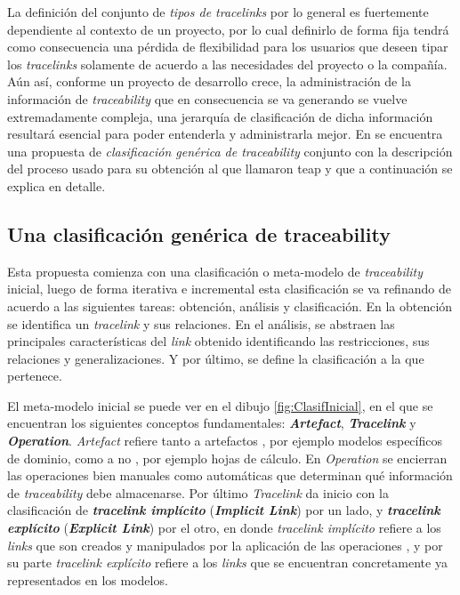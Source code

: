 \documentclass[a4paper,12pt,oneside,spanish]{book}
\begin{document}
La definición del conjunto de \textit{tipos de tracelinks} por lo general es fuertemente dependiente al contexto de un proyecto, por lo cual definirlo de forma fija tendrá como consecuencia una pérdida de flexibilidad para los usuarios que deseen tipar los \textit{tracelinks} solamente de acuerdo a las necesidades del proyecto o la compañía. Aún así, conforme un proyecto de desarrollo crece, la administración de la información de \textit{traceability} que en consecuencia se va generando se vuelve extremadamente compleja, una jerarquía de clasificación de dicha información resultará esencial para poder entenderla y administrarla mejor. En \cite{PaigeOlsenKolovosZschalerPower} se encuentra una propuesta de \textit{clasificación genérica de traceability} conjunto con la descripción del proceso usado para su obtención al que llamaron \gls{teap} y que a continuación se explica en detalle.



\subsection{Una clasificación genérica de traceability}
\label{sec:ClasificacionTraceability}


Esta propuesta comienza con una clasificación o meta-modelo de \textit{traceability} inicial, luego de forma iterativa e incremental esta clasificación se va refinando de acuerdo a las siguientes tareas: obtención, análisis y clasificación. En la obtención se identifica un \textit{tracelink} y sus relaciones. En el análisis, se abstraen las principales características del \textit{link} obtenido identificando las restricciones, sus relaciones y generalizaciones. Y por último, se define la clasificación a la que pertenece.

El meta-modelo inicial se puede ver en el dibujo \ref{fig:ClasifInicial}, en el que se encuentran los siguientes conceptos fundamentales: \textit{\textbf{Artefact}}, \textit{\textbf{Tracelink}} y \textit{\textbf{Operation}}. \textit{Artefact} refiere tanto a artefactos , por ejemplo modelos específicos de dominio, como a no , por ejemplo hojas de cálculo. En \textit{Operation} se encierran las operaciones bien manuales como automáticas que determinan qué información de \textit{traceability} debe almacenarse. Por último \textit{Tracelink} da inicio con la clasificación de \textit{\textbf{tracelink implícito}} (\textit{\textbf{Implicit Link}}) por un lado, y \textit{\textbf{tracelink explícito}} (\textit{\textbf{Explicit Link}}) por el otro, en donde \textit{tracelink implícito} refiere a los \textit{links} que son creados y manipulados por la aplicación de las operaciones , y por su parte \textit{tracelink explícito} refiere a los \textit{links} que se encuentran concretamente ya representados en los modelos.
\end{document}
